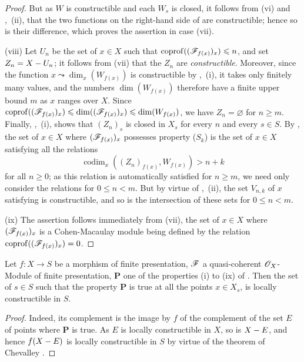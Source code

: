 \begin{proof}
But as $W$ is constructible  and each $W_s$ is closed, it follows from (vi) and ,~(ii), that the two functions on the right-hand side of  are constructible; hence so is their difference, which proves the assertion in case (vii).

(viii) Let $U_n$ be the set of $x\in X$ such that $\operatorname{coprof}((\mathscr{F}_{f(x)})_x)\leqslant n$, and set $Z_n=X- U_n$; it follows from (vii) that the $Z_n$ are \emph{constructible}.
Moreover, since the function $x\leadsto\dim_x(W_{f(x)})$ is constructible by ,~(i), it takes only finitely many values, and the numbers $\dim(W_{f(x)})$ therefore have a finite upper bound $m$ as $x$ ranges over $X$.
Since $\operatorname{coprof}((\mathscr{F}_{f(x)})_x)\leqslant\dim((\mathscr{F}_{f(x)})_x)\leqslant\dim(W_{f(x)})$, we have $Z_n=\varnothing$ for $n\geqslant m$.
Finally, ,~(i), shows that $(Z_n)_s$ is closed in $X_s$ for every $n$ and every $s\in S$.
By , the set of $x\in X$ where $(\mathscr{F}_{f(x)})_x$ possesses property ($S_k$) is the set of $x\in X$ satisfying all the relations
\begin{equation}
\tag{9.9.2.2}
\label{IV.9.9.2.2}
  \operatorname{codim}_x((Z_n)_{f(x)},W_{f(x)})>n+k
\end{equation}
for all $n\geqslant 0$; as this relation is automatically satisfied for $n\geqslant m$, we need only consider the relations  for $0\leqslant n<m$.
But by virtue of ,~(ii), the set $V_{n,k}$ of $x$ satisfying  is constructible, and so is the intersection of these sets for $0\leqslant n<m$.

(ix) The assertion follows immediately from (vii), the set of $x\in X$ where $(\mathscr{F}_{f(x)})_x$ is a Cohen-Macaulay module being defined by the relation $\operatorname{coprof}((\mathscr{F}_{f(x)})_x)=0$.
\end{proof}

\begin{corollary}[9.9.3]
\label{IV.9.9.3}
Let $f:X\to S$ be a morphism of finite presentation, $\mathscr{F}$ a quasi-coherent $\mathscr{O}_X$-Module of finite presentation, $\boldsymbol{P}$ one of the properties \textup{(i)} to \textup{(ix)} of .
Then the set of $s\in S$ such that the property $\boldsymbol{P}$ is true at all the points $x\in X_s$, is locally constructible in $S$.
\end{corollary}

\begin{proof}
\label{IV.9.9.3-proof}
Indeed, its complement is the image by $f$ of the complement of the set $E$ of points where $\boldsymbol{P}$ is true.
As $E$ is locally constructible in $X$, so is $X- E$, and hence $f(X- E)$ is locally constructible in $S$ by virtue of the theorem of Chevalley .
\end{proof}

